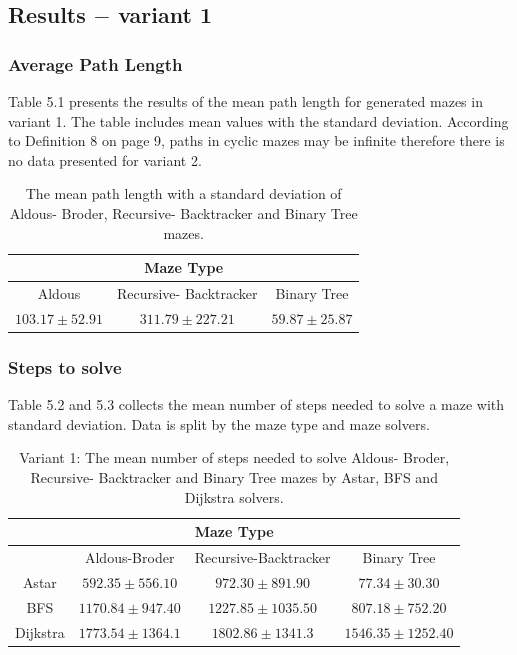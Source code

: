 \subsection{Results $-$ variant 1}
\subsubsection{Average Path Length}
Table 5.1 presents the results of the mean path length for generated mazes in variant 1. The table includes mean values with the standard deviation.
According to Definition 8 on page 9, paths in cyclic mazes may be infinite therefore there is no data presented for variant 2.
    \begin{table}[!h]
        \begin{center} 
            \caption{The mean path length with a standard deviation of Aldous- Broder, Recursive- Backtracker and Binary Tree mazes.} 
        \begin{tabular}{ c c c } 
        \multicolumn{3}{c}{Maze Type} \\
        \hline
        Aldous&Recursive- Backtracker&Binary Tree\\
        \hline
        $103.17\pm 52.91$&$311.79\pm 227.21$&$59.87\pm 25.87$\\
        \hline
         \end{tabular} 
        \end{center}
         \end{table}
\subsubsection{Steps to solve}
Table 5.2 and 5.3  collects the mean number of steps needed to solve a maze with standard deviation. Data is split by the maze type and maze solvers.
\begin{table}[!h]
    \begin{center} 
        \caption{Variant 1: The mean number of steps needed to solve Aldous- Broder, Recursive- Backtracker and Binary Tree mazes by Astar,
         BFS and Dijkstra solvers.} 
    \begin{tabular}{ c c c c} 
    \multicolumn{4}{c}{Maze Type} \\
    \hline
    &Aldous-Broder&Recursive-Backtracker&Binary Tree\\
    \hline
    Astar&$592.35\pm 556.10$&$972.30\pm 891.90$&$77.34\pm 30.30$\\
    \hline
    BFS&$1170.84\pm 947.40$&$1227.85\pm 1035.50$&$807.18\pm 752.20$\\
    \hline
    Dijkstra&$1773.54\pm 1364.1$&$1802.86\pm 1341.3$&$1546.35\pm 1252.40$\\
    \hline
     \end{tabular} 
    \end{center}
     \end{table}

